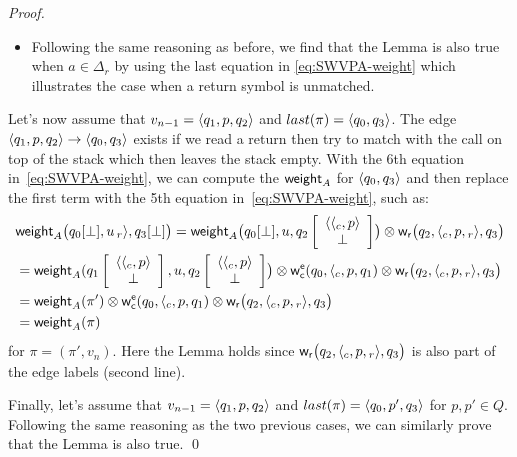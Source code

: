 \begin{proof}
\begin{itemize}
\item Following the same reasoning as before, we find that the Lemma is also true when $a \in \Delta_r$ by using the last equation in \eqref{eq:SWVPA-weight} which illustrates the case when a return symbol is unmatched.
%
\end{itemize}
\noindent
Let's now assume that $v_{n-1} = \< q_1, p, q_2>$ and $last(\pi) = \< q_0, q_3>$. The edge $\< q_1, p, q_2> \to \< q_0, q_3>$ exists if we read a return then try to match with the call on top of the stack which then leaves the stack empty. With the 6th equation in~\eqref{eq:SWVPA-weight}, we can compute the $\mathsf{weight}_A$ for $\<q_0, q_3>$ and then replace the first term with the 5th equation in~\eqref{eq:SWVPA-weight}, such as:
\begin{align*}
&\weight_A\bigl(\config{q_0}{\bot}, u\,{\return{r}},
               \config{q_3}{\bot}\bigr) =
  \weight_A\bigl(\config{q_0}{\bot}, u,
                 \configup{q_2}{\<{\call{c}}, p>\stackup\bot}\bigr)
  \otimes \weir\bigl(q_2, {\call{c}}, p, {\return{r}}, q_3\bigr)\\
  &=
   \weight_A(\configup{q_1}{\<{\call{c}}, p>\stackup\bot}, u, \configup{q_2}{\<{\call{c}}, p>\stackup\bot}\bigr)
 \otimes \weiec(q_0, {\call{c}}, p, q_1)
  \otimes \weir\bigl(q_2, {\call{c}}, p, {\return{r}}, q_3\bigr)\\
  &= \weight_A(\pi')\otimes \weiec(q_0, {\call{c}}, p, q_1)
  \otimes \weir\bigl(q_2, {\call{c}}, p, {\return{r}}, q_3\bigr)\\
  &= \weight_A(\pi)
\end{align*}
for $\pi = (\pi', v_n)$. Here the Lemma holds since ${\mathsf{w}_\mathsf{r}}\bigl(q_2, {\langle_{c}}, p, {_{r}{\rangle}}, q_3\bigr)$ is also part of the edge labels (second line).

Finally, let's assume that $v_{n-1} = \<q_1, p, q_2>$ and $last(\pi) = \<q_0, p', q_3>$ for $p, p' \in Q$. Following the same reasoning as the two previous cases, we can similarly prove that the Lemma is also true.
\qed
\end{proof}



